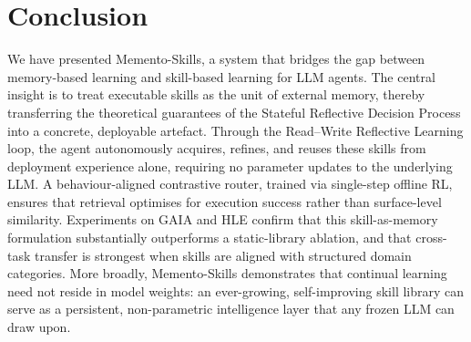 \documentclass[11pt,a4paper]{article}
\begin{document}


\newpage

\section{Conclusion}

We have presented Memento-Skills, a system that bridges the gap between memory-based learning and skill-based learning for LLM agents. The central insight is to treat executable skills as the unit of external memory, thereby transferring the theoretical guarantees of the Stateful Reflective Decision Process into a concrete, deployable artefact. Through the Read--Write Reflective Learning loop, the agent autonomously acquires, refines, and reuses these skills from deployment experience alone, requiring no parameter updates to the underlying LLM. A behaviour-aligned contrastive router, trained via single-step offline RL, ensures that retrieval optimises for execution success rather than surface-level similarity. Experiments on GAIA and HLE confirm that this skill-as-memory formulation substantially outperforms a static-library ablation, and that cross-task transfer is strongest when skills are aligned with structured domain categories. More broadly, Memento-Skills demonstrates that continual learning need not reside in model weights: an ever-growing, self-improving skill library can serve as a persistent, non-parametric intelligence layer that any frozen LLM can draw upon.
\end{document}
